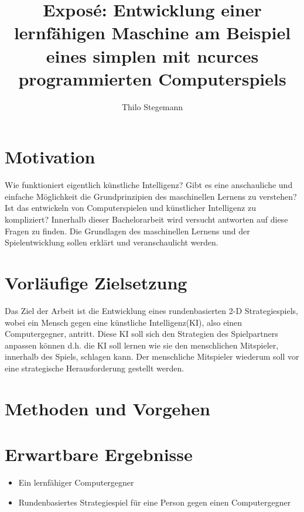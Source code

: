 \documentclass[12pt,a4paper]{article}
\author{Thilo Stegemann}
\title{Exposé: Entwicklung einer lernfähigen Maschine am Beispiel eines simplen mit ncurces programmierten Computerspiels}
\begin{document}
\maketitle

\section*{Motivation}
Wie funktioniert eigentlich künstliche Intelligenz? Gibt es eine anschauliche und einfache Möglichkeit die Grundprinzipien des maschinellen Lernens zu verstehen? Ist das entwickeln von Computerspielen und künstlicher Intelligenz zu kompliziert?
Innerhalb dieser Bachelorarbeit wird versucht antworten auf diese Fragen zu finden. Die Grundlagen des maschinellen Lernens und der Spielentwicklung sollen erklärt und veranschaulicht werden. 

\section*{Vorläufige Zielsetzung}
Das Ziel der Arbeit ist die Entwicklung eines rundenbasierten 2-D Strategiespiels, wobei ein Mensch gegen eine künstliche Intelligenz(KI), also einen Computergegner, antritt. Diese KI soll sich den Strategien des Spielpartners anpassen können d.h. die KI soll lernen wie sie den menschlichen Mitspieler, innerhalb des Spiels, schlagen kann. Der menschliche Mitspieler wiederum soll vor eine strategische Herausforderung gestellt werden.

\section*{Methoden und Vorgehen}

\section*{Erwartbare Ergebnisse}
\begin{itemize}
	\item Ein lernfähiger Computergegner
	\item Rundenbasiertes Strategiespiel für eine Person gegen einen Computergegner 
\end{itemize}
\end{document}
